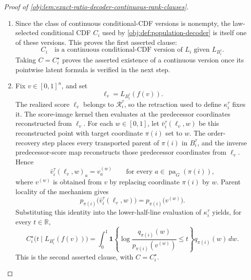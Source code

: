 \begin{proof}[Proof of \cref{obj:lem:exact-ratio-decoder-continuous-rank-clauses}]
\begin{enumerate}
\item Since the class of continuous conditional-CDF versions is nonempty, the law-selected conditional CDF \(C_i\) used by \cref{obj:def:population-decoder} is itself one of these versions.  This proves the first asserted clause:
\[
C_i
\quad\text{is a continuous conditional-CDF version of }L_i\text{ given }L_{B_i^\tau}.
\]
Taking \(C=C_i^\star\) proves the asserted existence of a continuous version once its pointwise latent formula is verified in the next step. %

\item Fix \(v\in[0,1]^n\), and set
\[
\ell_v=L_{B_i^\tau}(f(v)).
\]
The realized score \(\ell_v\) belongs to \(\mathcal R_i^\tau\), so the retraction used to define \(\kappa_i^\tau\) fixes it.  The score-image kernel then evaluates at the predecessor coordinates reconstructed from \(\ell_v\).  For each \(w\in[0,1]\), let \(\bar v_i^\tau(\ell_v,w)\) be this reconstructed point with target coordinate \(\pi(i)\) set to \(w\).  The order-recovery step places every transported parent of \(\pi(i)\) in \(B_i^\tau\), and the inverse predecessor-score map reconstructs those predecessor coordinates from \(\ell_v\).  Hence
\[
\bar v_i^\tau(\ell_v,w)_a=v^{(w)}_a
\qquad
\text{for every }a\in\operatorname{pa}_G(\pi(i)),
\]
where \(v^{(w)}\) is obtained from \(v\) by replacing coordinate \(\pi(i)\) by \(w\).  Parent locality of the mechanism gives
\[
p_{\pi(i)}\bigl(\bar v_i^\tau(\ell_v,w)\bigr)
=
p_{\pi(i)}\bigl(v^{(w)}\bigr).
\]
Substituting this identity into the lower-half-line evaluation of \(\kappa_i^\tau\) yields, for every \(t\in\mathbb R\),
\[
C_i^\star\bigl(t\mid L_{B_i^\tau}(f(v))\bigr)
=
\int_0^1
\mathbf 1\!\left\{
\log\frac{q_{\pi(i)}(w)}
{p_{\pi(i)}(v^{(w)})}\le t
\right\}
q_{\pi(i)}(w)\,dw .
\]
This is the second asserted clause, with \(C=C_i^\star\). %


\end{enumerate}
\end{proof}

